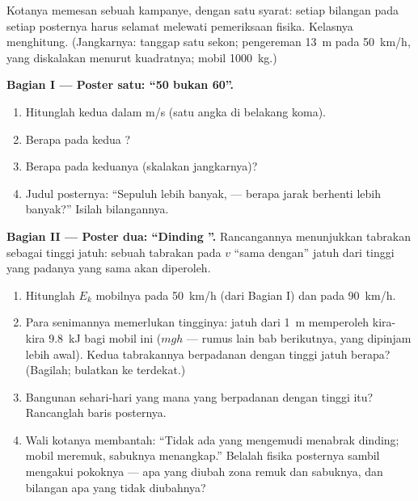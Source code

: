 \begin{problem}\label{pb:g9:kinetic-energy-safety:1}
Kotanya memesan sebuah kampanye, dengan satu syarat: setiap bilangan
pada setiap posternya harus selamat melewati pemeriksaan fisika.
Kelasnya menghitung. (Jangkarnya: tanggap satu sekon; pengereman
\qty{13}{m} pada \qty{50}{km/h}, yang diskalakan menurut kuadratnya;
 mobil \qty{1000}{kg}.)

\medskip\noindent\textbf{Bagian I --- Poster satu: ``50 bukan
60''.}
\begin{enumerate}
  \item Hitunglah kedua  dalam \unit{m/s} (satu angka di
        belakang koma).
  \item Berapa  pada kedua ?
  \item Berapa  pada keduanya (skalakan
        jangkarnya)?
  \item Judul posternya: ``Sepuluh   lebih banyak, ---
        berapa  jarak berhenti lebih banyak?'' Isilah
        bilangannya.
\end{enumerate}

\medskip\noindent\textbf{Bagian II --- Poster dua: ``Dinding
''.}
Rancangannya menunjukkan  tabrakan sebagai tinggi jatuh: sebuah
tabrakan pada  $v$ ``sama dengan'' jatuh dari tinggi yang
padanya  yang sama akan diperoleh.
\begin{enumerate}[resume]
  \item Hitunglah $E_k$ mobilnya pada \qty{50}{km/h} (dari
        Bagian I) dan pada \qty{90}{km/h}.
  \item Para senimannya memerlukan tingginya: jatuh dari \qty{1}{m}
        memperoleh kira-kira \qty{9.8}{kJ} bagi mobil ini ($m g h$ ---
        rumus lain bab berikutnya, yang dipinjam lebih awal). Kedua
         tabrakannya berpadanan dengan tinggi jatuh berapa?
        (Bagilah; bulatkan ke  terdekat.)
  \item Bangunan sehari-hari yang mana yang berpadanan dengan tinggi
        itu? Rancanglah baris posternya.
  \item Wali kotanya membantah: ``Tidak ada yang mengemudi menabrak
        dinding; mobil meremuk, sabuknya menangkap.'' Belalah fisika
        posternya sambil mengakui pokoknya --- apa yang diubah zona
        remuk dan sabuknya, dan bilangan apa yang tidak diubahnya?
\end{enumerate}


\end{problem}
